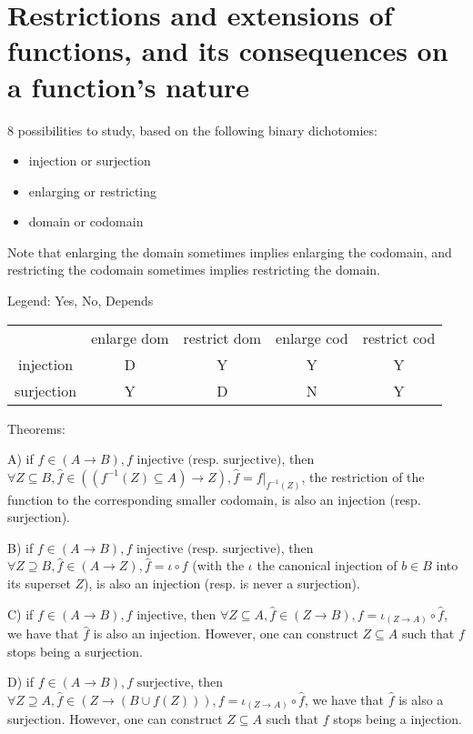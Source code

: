 \section*{Restrictions and extensions of functions, and its consequences on a function's nature}

8 possibilities to study, based on the following binary dichotomies:
\begin{itemize}
	\item injection or surjection
	\item enlarging or restricting
	\item domain or codomain
\end{itemize}

Note that enlarging the domain sometimes implies enlarging the codomain, and restricting the codomain sometimes implies restricting the domain.

Legend: Yes, No, Depends

\begin{tabular}{c c c c c}
			& enlarge dom	& restrict dom	& enlarge cod	& restrict cod \\
injection	& D				& Y				& Y				& Y            \\
surjection	& Y				& D				& N				& Y
\end{tabular}


Theorems:

A) if $f \in (A \to B), f \text{ injective (resp. surjective)}$, then $\forall Z \subseteq B, \hat{f} \in ((f^{-1}(Z) \subseteq A) \to Z), \hat{f} = f|_{f^{-1}(Z)}$, the restriction of the function to the corresponding smaller codomain, is also an injection (resp. surjection).

B) if $f \in (A \to B), f \text{ injective (resp. surjective)}$, then $\forall Z \supseteq B, \hat{f} \in (A \to Z), \hat{f} = \iota \circ f$ (with the $\iota$ the canonical injection of $b \in B$ into its superset $Z$), is also an injection (resp. is never a surjection).

C) if $f \in (A \to B), f \text{ injective}$, then $\forall Z \subseteq A, \hat{f} \in (Z \to B), f = \iota_{(Z \to A)} \circ \hat{f}$, we have that $\hat{f}$ is also an injection. However, one can construct $Z \subseteq A$ such that $f$ stops being a surjection.

D) if $f \in (A \to B), f \text{ surjective}$, then $\forall Z \supseteq A, \hat{f} \in (Z \to (B \cup f(Z))), f = \iota_{(Z \to A)} \circ \hat{f}$, we have that $\hat{f}$ is also a surjection. However, one can construct $Z \subseteq A$ such that $f$ stops being a injection.

